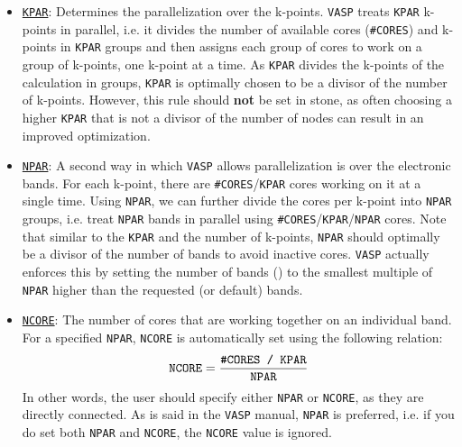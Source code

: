 \begin{refsection}
\begin{itemize} 

\item \href{https://cms.mpi.univie.ac.at/wiki/index.php/KPAR}{\texttt{KPAR}}: 
Determines the parallelization over the k-points. \texttt{VASP} treats 
\texttt{KPAR} k-points in parallel, i.e. it divides the number of available cores (\texttt{\#CORES}) and 
k-points in \texttt{KPAR} groups and then assigns each group of cores to work 
on a group of k-points, one k-point at a time. As \texttt{KPAR} divides the 
k-points of the calculation in groups, \texttt{KPAR} is optimally chosen to be 
a divisor of the number of k-points. However, this rule should \textbf{not} be 
set in stone, as often choosing a higher \texttt{KPAR} that is not a divisor 
of the number of nodes can result in an improved optimization. 
 
\item \href{https://cms.mpi.univie.ac.at/wiki/index.php/NPAR}{\texttt{NPAR}}: 
A second way in which \texttt{VASP} allows parallelization is over the 
electronic bands. For each k-point, there are \verb|#CORES|/\verb|KPAR| cores 
working on it at a single time. Using \verb|NPAR|, we can further divide the 
cores per k-point into \verb|NPAR| groups, i.e. treat \verb|NPAR| bands in 
parallel using \verb|#CORES|/\verb|KPAR|/\verb|NPAR| cores. Note that similar 
to the \verb|KPAR| and the number of k-points,  \verb|NPAR| should optimally 
be a divisor of the number of bands to avoid inactive cores. \texttt{VASP} 
actually enforces this by setting the number of bands () to the 
smallest multiple of \verb|NPAR| higher than the requested (or default) bands. 
 
\item 
\href{https://cms.mpi.univie.ac.at/wiki/index.php/NCORE}{\texttt{NCORE}}: The 
number of cores that are working together on an individual band. For a 
specified \verb|NPAR|, \verb|NCORE| is automatically set using the following 
relation: 
\begin{equation*} 
\texttt{NCORE} = \frac{\texttt{\#CORES / \texttt{KPAR}}}{\texttt{NPAR}} 
\end{equation*} 
In other words, the user should specify either \verb|NPAR| or \verb|NCORE|, as 
they are directly connected. As is said in the \texttt{VASP} manual, 
\verb|NPAR| is preferred, i.e. if you do set both \verb|NPAR| and 
\verb|NCORE|, the \verb|NCORE| value is ignored. 
 
 

\end{itemize}
\end{refsection}
